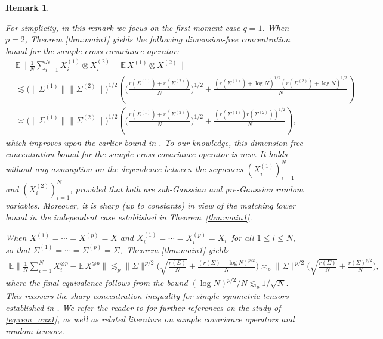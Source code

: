 \documentclass[numbers,webpdf,imaiai]{ima-authoring-template}
\theoremstyle{thmstyletwo}%
\newtheorem{remark}{Remark}%
\numberwithin{equation}{section}
\numberwithin{equation}{section}
\newcommand{\E}{\mathbb{E}}
\begin{document}
\begin{remark}\label{rem:main1_1}



For simplicity, in this remark we focus on the first-moment case $q=1$. When $p=2$, Theorem \ref{thm:main1} yields the following dimension-free concentration bound for the sample cross-covariance operator:
\begin{align*}
&\E \bigg\|\frac{1}{N}\sum_{i=1}^{N}X^{(1)}_i\otimes X^{(2)}_i-\E\, X^{(1)}\otimes X^{(2)}\bigg\|\\
&\lesssim \big(\|\Sigma^{(1)}\|\|\Sigma^{(2)}\|\big)^{1/2}\left(\bigg(\frac{r(\Sigma^{(1)})+r(\Sigma^{(2)})}{N}\bigg)^{1/2}+\frac{(r(\Sigma^{(1)})+\log N)^{1/2}(r(\Sigma^{(2)})+\log N)^{1/2}}{N}\right)\\
&\asymp \big(\|\Sigma^{(1)}\|\|\Sigma^{(2)}\|\big)^{1/2}\left(\bigg(\frac{r(\Sigma^{(1)})+r(\Sigma^{(2)})}{N}\bigg)^{1/2}+\frac{(r(\Sigma^{(1)})r(\Sigma^{(2)}))^{1/2}}{N}\right),
\end{align*}
which improves upon the earlier bound in \cite[Lemma A.3]{ghattas2022non}. To our knowledge, this dimension-free concentration bound for the sample cross-covariance operator is new. It holds without any assumption on the dependence between the sequences $(X_i^{(1)})_{i=1}^{N}$ and $(X_i^{(2)})_{i=1}^{N}$, provided that both are sub-Gaussian and pre-Gaussian random variables. Moreover, it is sharp (up to constants) in view of the matching lower bound in the independent case established in Theorem~\ref{thm:main1}. 

When $X^{(1)}=\cdots = X^{(p)}=X$ and $X_i^{(1)}=\cdots = X_i^{(p)}=X_i \,$ for all $1\le i\le N,$ so that $\Sigma^{(1)}=\cdots=\Sigma^{(p)}=\Sigma,$ Theorem \ref{thm:main1} yields
\begin{align}\label{eq:rem_aux1}
\E \bigg\|\frac{1}{N}\sum_{i=1}^{N} X_i^{\otimes p}-\E\, X^{\otimes p}\bigg\| \lesssim_p \|\Sigma\|^{p/2} \bigg(\sqrt{\frac{r(\Sigma)}{N}}+\frac{(r(\Sigma)+\log N)^{p/2}}{N}\bigg) \asymp_p \|\Sigma\|^{p/2} \bigg(\sqrt{\frac{r(\Sigma)}{N}}+\frac{r(\Sigma)^{p/2}}{N}\bigg),
\end{align}
where the final equivalence follows from the bound $(\log N)^{p/2}/N\lesssim_p 1/\sqrt{N}$. This recovers the sharp concentration inequality for simple symmetric tensors established in \cite[Theorem 2.1]{al2025sharp}. We refer the reader to \cite{al2025sharp} for further references on the study of \eqref{eq:rem_aux1}, as well as related literature on sample covariance operators and random tensors.


\end{remark}
\end{document}
